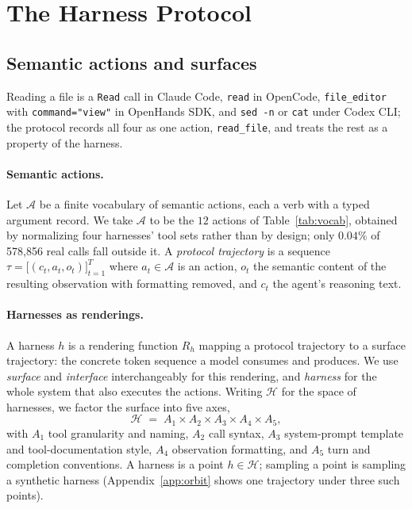 \documentclass{article} %
\newcommand{\claudecode}{Claude Code}
\newcommand{\opencode}{OpenCode}
\newcommand{\codexcli}{Codex CLI}
\newcommand{\openhands}{OpenHands SDK}   %
\newcommand{\numactions}{578{,}856}       %
\begin{document}
\section{The Harness Protocol}
\label{sec:protocol}

\subsection{Semantic actions and surfaces}

Reading a file is a \texttt{Read} call in \claudecode{}, \texttt{read} in
\opencode{}, \texttt{file\_editor} with \texttt{command="view"} in
\openhands{}, and \texttt{sed -n} or \texttt{cat} under \codexcli{}; the
protocol records all four as one action, \texttt{read\_file}, and treats the rest as a property of the harness.

\paragraph{Semantic actions.} Let $\mathcal{A}$ be a finite vocabulary of
semantic actions, each a verb with a typed argument record. We take
$\mathcal{A}$ to be the $12$ actions of Table~\ref{tab:vocab}, obtained by
normalizing four harnesses' tool sets rather than by design; only $0.04\%$ of
\numactions{} real calls fall outside it. A \emph{protocol
trajectory} is a sequence $\tau = \big[(c_t, a_t, o_t)\big]_{t=1}^{T}$ where
$a_t \in \mathcal{A}$ is an action, $o_t$ the semantic content of the resulting
observation with formatting removed, and $c_t$ the agent's reasoning text.

\paragraph{Harnesses as renderings.} A harness $h$ is a rendering function $R_h$
mapping a protocol trajectory to a surface trajectory: the concrete token
sequence a model consumes and produces. We use \emph{surface} and
\emph{interface} interchangeably for this rendering, and \emph{harness} for the
whole system that also executes the actions. Writing $\mathcal{H}$ for the
space of harnesses, we factor the surface into five axes,
\begin{equation}
\mathcal{H} \;=\; A_1 \times A_2 \times A_3 \times A_4 \times A_5 ,
\label{eq:axes}
\end{equation}
with $A_1$ tool granularity and naming, $A_2$ call syntax, $A_3$ system-prompt
template and tool-documentation style, $A_4$ observation formatting, and $A_5$
turn and completion conventions. A harness is a point $h \in \mathcal{H}$;
sampling a point is sampling a synthetic harness (Appendix~\ref{app:orbit}
shows one trajectory under three such points).
\end{document}
